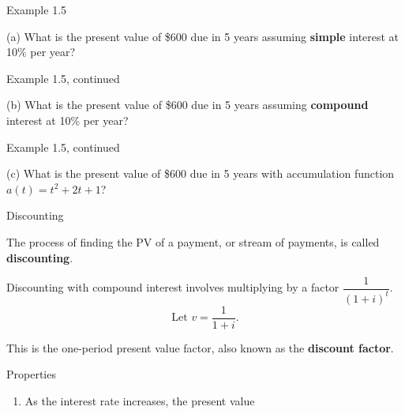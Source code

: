 \documentclass{beamer}
\begin{document}
\begin{frame}{Example 1.5}

(a) What is the present value of \$600 due in 5 years assuming \textbf{simple} interest at 10\% per year?

\begin{center}
\end{center}

\vfill
\end{frame}

\begin{frame}{Example 1.5, continued}

(b) What is the present value of \$600 due in 5 years assuming \textbf{compound} interest at 10\% per year?

\begin{center}
\end{center}

\vfill
\end{frame}

\begin{frame}{Example 1.5, continued}

(c) What is the present value of \$600 due in 5 years with accumulation function $a(t) = t^2 + 2t + 1$?

\vfill
\end{frame}

\begin{frame}{Discounting}

The process of finding the PV of a payment, or stream of payments, is called \textbf{discounting}.

\bigskip
Discounting with compound interest involves multiplying by a factor $\dfrac{1}{(1+i)^t}$.
\[
\text{Let } v = \frac{1}{1+i}.
\]

This is the one-period present value factor, also known as the \textbf{discount factor}.

\end{frame}

\begin{frame}{Properties}

\begin{enumerate}
\item As the interest rate increases, the present value
\end{enumerate}

\begin{center}
\end{center}

\vfill
\end{frame}
\end{document}
